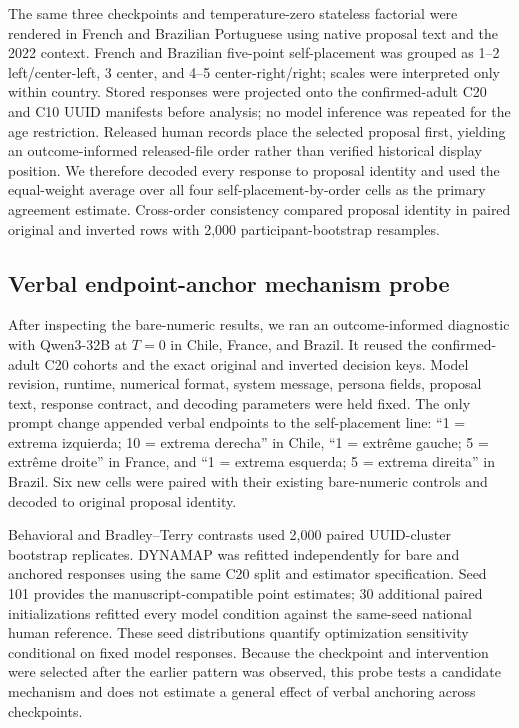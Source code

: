 \documentclass[unnumsec,webpdf,modern,large]{oup-authoring-template}
\begin{document}
The same three checkpoints and temperature-zero stateless factorial were rendered in French and Brazilian Portuguese using native proposal text and the 2022 context. French and Brazilian five-point self-placement was grouped as 1--2 left/center-left, 3 center, and 4--5 center-right/right; scales were interpreted only within country. Stored responses were projected onto the confirmed-adult C20 and C10 UUID manifests before analysis; no model inference was repeated for the age restriction. Released human records place the selected proposal first, yielding an outcome-informed released-file order rather than verified historical display position. We therefore decoded every response to proposal identity and used the equal-weight average over all four self-placement-by-order cells as the primary agreement estimate. Cross-order consistency compared proposal identity in paired original and inverted rows with 2,000 participant-bootstrap resamples.

\subsection{Verbal endpoint-anchor mechanism probe}

After inspecting the bare-numeric results, we ran an outcome-informed diagnostic with Qwen3-32B at $T=0$ in Chile, France, and Brazil. It reused the confirmed-adult C20 cohorts and the exact original and inverted decision keys. Model revision, runtime, numerical format, system message, persona fields, proposal text, response contract, and decoding parameters were held fixed. The only prompt change appended verbal endpoints to the self-placement line: ``1 = extrema izquierda; 10 = extrema derecha'' in Chile, ``1 = extr\^{e}me gauche; 5 = extr\^{e}me droite'' in France, and ``1 = extrema esquerda; 5 = extrema direita'' in Brazil. Six new cells were paired with their existing bare-numeric controls and decoded to original proposal identity.

Behavioral and Bradley--Terry contrasts used 2,000 paired UUID-cluster bootstrap replicates. DYNAMAP was refitted independently for bare and anchored responses using the same C20 split and estimator specification. Seed 101 provides the manuscript-compatible point estimates; 30 additional paired initializations refitted every model condition against the same-seed national human reference. These seed distributions quantify optimization sensitivity conditional on fixed model responses. Because the checkpoint and intervention were selected after the earlier pattern was observed, this probe tests a candidate mechanism and does not estimate a general effect of verbal anchoring across checkpoints.
\end{document}
